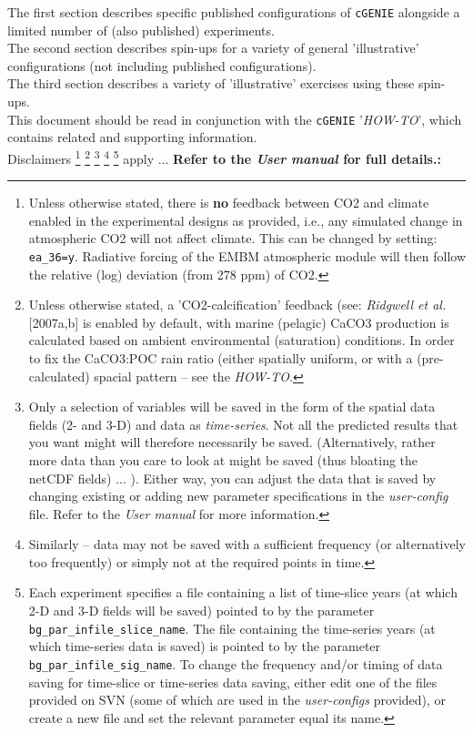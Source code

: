 \documentclass[10pt,twoside]{article}
\begin{document}
The first section describes specific published configurations of \texttt{cGENIE} alongside a limited number of (also published) experiments. 
\\The second section describes spin-ups for a variety of general 'illustrative' configurations (not including published configurations).
\\The third section describes a variety of 'illustrative' exercises using these spin-ups.
\\This document should be read in conjunction with the \texttt{cGENIE} '\textit{HOW-TO}', which contains related and supporting information.
\\Disclaimers
\footnote{Unless otherwise stated, there is \textbf{no} feedback between CO2 and climate enabled in the experimental designs as provided, i.e., any simulated change in atmospheric CO2 will not affect climate. This can be changed by setting: \texttt{ea\_36=y}. Radiative forcing of the EMBM atmospheric module will then follow the relative (log) deviation (from 278 ppm) of CO2.}
\footnote{Unless otherwise stated, a 'CO2-calcification' feedback (see: \textit{Ridgwell et al.} [2007a,b] is enabled by default, with marine (pelagic) CaCO3 production is calculated based on ambient environmental (saturation) conditions. In order to fix the CaCO3:POC rain ratio (either spatially uniform, or with a (pre-calculated) spacial pattern -- see the \textit{HOW-TO}.}
\footnote{Only a selection of variables will be saved in the form of the spatial data fields (2- and 3-D) and data as \textit{time-series}. Not all the predicted results that you want might will therefore necessarily be saved. (Alternatively, rather more data than you care to look at might be saved (thus bloating the netCDF fields) ... ). Either way, you can adjust the data that is saved by changing existing or adding new parameter specifications in the \textit{user-config} file. Refer to the \textit{User manual} for more information.}
\footnote{Similarly -- data may not be saved with a sufficient frequency (or alternatively too frequently) or simply not at the required points in time.}
\footnote{Each experiment specifies a file containing a list of time-slice years (at which 2-D and 3-D fields will be saved) pointed to by the parameter \texttt{bg\_par\_infile\_slice\_name}. The file containing the time-series years (at which time-series data is saved) is pointed to by the parameter \texttt{bg\_par\_infile\_sig\_name}. To change the frequency and/or timing of data saving for time-slice or time-series data saving, either edit one of the files provided on SVN (some of which are used in the \textit{user-configs} provided), or create a new file and set the relevant parameter equal its name.}
apply ... \textbf{Refer to the \textit{User manual} for full details.:}
\end{document}
